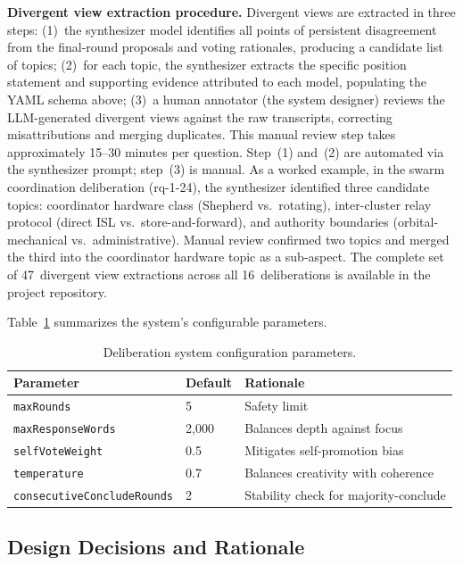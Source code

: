 \documentclass[11pt,a4paper]{article}
\begin{document}
\textbf{Divergent view extraction procedure.} Divergent views are extracted in three steps: (1)~the synthesizer model identifies all points of persistent disagreement from the final-round proposals and voting rationales, producing a candidate list of topics; (2)~for each topic, the synthesizer extracts the specific position statement and supporting evidence attributed to each model, populating the YAML schema above; (3)~a human annotator (the system designer) reviews the LLM-generated divergent views against the raw transcripts, correcting misattributions and merging duplicates. This manual review step takes approximately 15--30 minutes per question. Step~(1) and~(2) are automated via the synthesizer prompt; step~(3) is manual. As a worked example, in the swarm coordination deliberation (rq-1-24), the synthesizer identified three candidate topics: coordinator hardware class (Shepherd vs.\ rotating), inter-cluster relay protocol (direct ISL vs.\ store-and-forward), and authority boundaries (orbital-mechanical vs.\ administrative). Manual review confirmed two topics and merged the third into the coordinator hardware topic as a sub-aspect. The complete set of 47~divergent view extractions across all 16~deliberations is available in the project repository.

Table~\ref{tab:config} summarizes the system's configurable parameters.

\begin{table}[ht]
\centering
\caption{Deliberation system configuration parameters.}
\label{tab:config}
\begin{tabular}{@{}llp{5.5cm}@{}}
\toprule
\textbf{Parameter} & \textbf{Default} & \textbf{Rationale} \\
\midrule
\texttt{maxRounds} & 5 & Safety limit \\
\texttt{maxResponseWords} & 2{,}000 & Balances depth against focus \\
\texttt{selfVoteWeight} & 0.5 & Mitigates self-promotion bias \\
\texttt{temperature} & 0.7 & Balances creativity with coherence \\
\texttt{consecutiveConcludeRounds} & 2 & Stability check for majority-conclude \\
\bottomrule
\end{tabular}
\end{table}

\subsection{Design Decisions and Rationale}
\label{sec:design_decisions}
\end{document}
